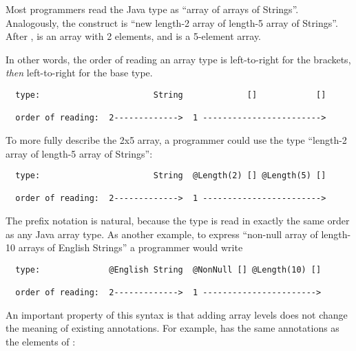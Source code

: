 \documentclass[10pt]{article}
\begin{document}
Most programmers read the Java type  as
``array of arrays of Strings''.  Analogously, the construct
 is ``new length-2 array of length-5 array of Strings''.
After ,  is an array with
2 elements, and  is a 5-element array.

In other words, the order of reading an array type is left-to-right for the
brackets, \emph{then} left-to-right for the base type.

\begin{Verbatim}
  type:                       String             []            []

  order of reading:  2------------->  1 ------------------------>
\end{Verbatim}



To more fully describe the 2x5 array, a programmer could use the
type ``length-2 array of length-5 array of Strings'':

\begin{Verbatim}
  type:                       String  @Length(2) [] @Length(5) []

  order of reading:  2------------->  1 ------------------------>
\end{Verbatim}

The prefix notation is natural, because the type is read in exactly
the same order as any Java array type.  As another example, to express
``non-null array of length-10 arrays of English Strings'' a programmer
would write

\begin{Verbatim}
  type:              @English String  @NonNull [] @Length(10) []

  order of reading:  2------------->  1 ----------------------->
\end{Verbatim}




An important property of this syntax is that adding array levels does not
change the meaning of existing annotations.  For example,  has
the same annotations as the elements of :
\end{document}
